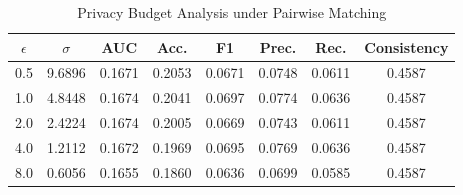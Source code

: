 \begin{table}[t]
\centering
\small
\caption{Privacy Budget Analysis under Pairwise Matching}
\label{tab:privacy_budget}
\begin{tabular}{cccccccc}
\hline
$\epsilon$ & $\sigma$ & AUC & Acc. & F1 & Prec. & Rec. & Consistency \\
\hline
0.5 & 9.6896 & 0.1671 & 0.2053 & 0.0671 & 0.0748 & 0.0611 & 0.4587 \\
1.0 & 4.8448 & 0.1674 & 0.2041 & 0.0697 & 0.0774 & 0.0636 & 0.4587 \\
2.0 & 2.4224 & 0.1674 & 0.2005 & 0.0669 & 0.0743 & 0.0611 & 0.4587 \\
4.0 & 1.2112 & 0.1672 & 0.1969 & 0.0695 & 0.0769 & 0.0636 & 0.4587 \\
8.0 & 0.6056 & 0.1655 & 0.1860 & 0.0636 & 0.0699 & 0.0585 & 0.4587 \\
\hline
\end{tabular}
\end{table}

